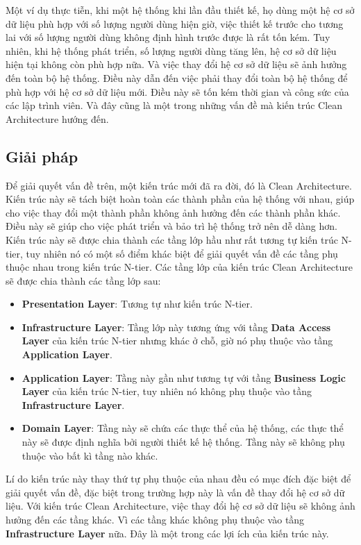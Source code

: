 \documentclass[../DoAn.tex]{subfiles}
\begin{document}
Một ví dụ thực tiễn, khi một hệ thống khi lần đầu thiết kế, họ dùng một hệ cơ sở dữ liệu phù hợp với số lượng người dùng hiện giờ, việc thiết kế trước cho tương lai với số lượng người dùng không định hình trước được là rất tốn kém. Tuy nhiên, khi hệ thống phát triển, số lượng người dùng tăng lên, hệ cơ sở dữ liệu hiện tại không còn phù hợp nữa. Và việc thay đổi hệ cơ sở dữ liệu sẽ ảnh hưởng đến toàn bộ hệ thống. Điều này dẫn đến việc phải thay đổi toàn bộ hệ thống để phù hợp với hệ cơ sở dữ liệu mới. Điều này sẽ tốn kém thời gian và công sức của các lập trình viên. Và đây cũng là một trong những vấn đề mà kiến trúc Clean Architecture hướng đến.


\subsection{Giải pháp}
\label{subsection:clean_architecture-solution}
Để giải quyết vấn đề trên, một kiến trúc mới đã ra đời, đó là Clean Architecture. Kiến trúc này sẽ tách biệt hoàn toàn các thành phần của hệ thống với nhau, giúp cho việc thay đổi một thành phần không ảnh hưởng đến các thành phần khác. Điều này sẽ giúp cho việc phát triển và bảo trì hệ thống trở nên dễ dàng hơn. Kiến trúc này sẽ được chia thành các tầng lớp hầu như rất tương tự kiến trúc N-tier, tuy nhiên nó có một số điểm khác biệt để giải quyết vấn đề các tầng phụ thuộc nhau trong kiến trúc N-tier. Các tầng lớp của kiến trúc Clean Architecture sẽ được chia thành các tầng lớp sau:
\begin{itemize}
    \item \textbf{Presentation Layer}: Tương tự như kiến trúc N-tier.
    \item \textbf{Infrastructure Layer}: Tầng lớp này tương ứng với tầng \textbf{Data Access Layer} của kiến trúc N-tier nhưng khác ở chỗ, giờ nó phụ thuộc vào tầng \textbf{Application Layer}.
    \item \textbf{Application Layer}: Tầng này gần như tương tự với tầng \textbf{Business Logic Layer} của kiến trúc N-tier, tuy nhiên nó không phụ thuộc vào tầng \textbf{Infrastructure Layer}.
    \item \textbf{Domain Layer}: Tầng này sẽ chứa các thực thể của hệ thống, các thực thể này sẽ được định nghĩa bởi người thiết kế hệ thống. Tầng này sẽ không phụ thuộc vào bất kì tầng nào khác.
\end{itemize}
Lí do kiến trúc này thay thứ tự phụ thuộc của nhau đều có mục đích đặc biệt để giải quyết vấn đề, đặc biệt trong trường hợp này là vấn đề thay đổi hệ cơ sở dữ liệu. Với kiến trúc Clean Architecture, việc thay đổi hệ cơ sở dữ liệu sẽ không ảnh hưởng đến các tầng khác. Vì các tầng khác không phụ thuộc vào tầng \textbf{Infrastructure Layer} nữa. Đây là một trong các lợi ích của kiến trúc này.
\end{document}
